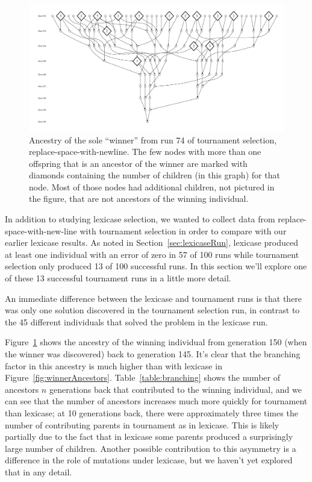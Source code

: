 \begin{figure}
	\vspace{0.6\columnwidth}
	\includegraphics[width=\columnwidth]{figures/ancestors_of_winner_rswn_tourney_run74_9gens.pdf}
	\caption{Ancestry of the sole ``winner'' from run 74 of tournament selection, 
		replace-space-with-newline. The few nodes with more than one offspring that is an ancestor of the winner
		are marked with diamonds containing the number of children (in this graph) for that node. Most of those
		nodes had additional children, not pictured in the figure, that are not ancestors of the winning individual.}
	\label{fig:winnerAncestorsTourneyRun74}
\end{figure}

In addition to studying lexicase selection, we wanted to collect data from replace-space-with-new-line 
with tournament selection in order to compare with our earlier lexicase results. As noted in 
Section~\ref{sec:lexicaseRun}, lexicase  produced at least one individual with an error of zero in 
57 of 100 runs while tournament selection only produced 13 of 100 successful runs. In this section
we'll explore one of these 13 successful tournament runs in a little more detail.

An immediate difference between the lexicase and tournament runs is that there was only one solution
discovered in the tournament selection run, in contrast to the 45 different 
individuals that solved the problem in the lexicase run.

Figure~\ref{fig:winnerAncestorsTourneyRun74} shows the ancestry of the winning individual from 
generation 150 (when the winner was discovered) back to generation 145. It's clear that the branching
factor in this ancestry is much higher than with lexicase in Figure~\ref{fig:winnerAncestors}. 
Table~\ref{table:branching} shows 
the number of ancestors $n$ generations back that contributed to the winning individual, and we can
see that the number of ancestors increases much more quickly for tournament than lexicase; 
at 10 generations back, there were approximately three times the number of contributing parents in 
tournament as in lexicase. This is likely partially
due to the fact that in lexicase some parents produced a surprisingly large number of children.
Another possible contribution to this asymmetry is a difference in the role of
mutations under lexicase, but we haven't yet explored that in any detail.

